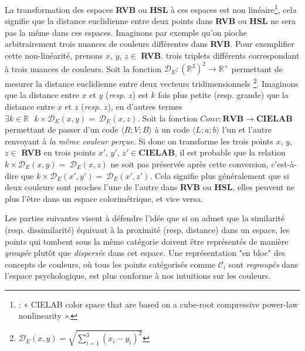 \documentclass{article}
\begin{document}
La transformation des espaces \textbf{RVB} ou \textbf{HSL} à ces espaces est non linéaire\footnote{\textcite[p.43]{fairchild2013}: « CIELAB color space that are based on a cube-root compressive power-law nonlinearity ».}, cela signifie que la distance euclidienne entre deux points dans \textbf{RVB} ou \textbf{HSL} ne sera pas la même dans ces espaces. Imaginons par exemple qu’on pioche arbitrairement trois nuances de couleurs différentes dans \textbf{RVB}. Pour exemplifier cette non-linéarité, prenons $x$, $y$, $z \in$ \textbf{RVB}. trois triplets différents correspondant à trois nuances de couleurs.  Soit la fonction \(\mathcal{D}_E\colon\left(\mathbb{R}^3\right)^2\rightarrow\mathbb{R}^+\) permettant de mesurer la distance euclidienne entre deux vecteurs tridimensionnels \footnote{$\mathcal{D}_E(x,y)=\sqrt{\sum_{i=1}^{3}\left(x_i - y_i \right)^2}$}. Imaginons que la distance entre $x$ et $y$ (\textit{resp.} $z$) est $k$ fois plus petite (resp. grande) que la distance entre $x$ et $z$ (\textit{resp.} $z$), en d’autres termes $\exists k\in\mathbb{R}\ \ \ k\times\mathcal{D}_E\left(x,y\right)=\ \mathcal{D}_E\left(x,z\right)$. Soit la fonction $Conv : \textbf{RVB} \rightarrow \textbf{CIELAB}$ permettant de passer d'un code $\langle R ; V ; B \rangle$ à un code $\langle L ;a ; b\rangle$ l’un et l’autre renvoyant à \textit{la même couleur perçue}. Si donc on transforme les trois points $x$, $y$, $z \in$ \textbf{RVB} en trois points $x'$, $y'$, $z' \in \textbf{CIELAB}$, il est probable que la relation $k\times\mathcal{D}_E\left(x,y\right)=\ \mathcal{D}_E\left(x,z\right)$ ne soit pas préservée après cette conversion, c’est-à-dire que $k\times\mathcal{D}_E\left(x',y'\right)=\ \mathcal{D}_E\left(x',z'\right)$. Cela signifie plus généralement que si deux couleurs sont proches l'une de l'autre dans \textbf{RVB} ou  \textbf{HSL}, elles peuvent ne plus l'être dans un espace colorimétrique, et vice versa.
\par
Les parties suivantes visent à défendre l’idée que si on admet que la similarité (resp. dissimilarité) équivaut à la proximité (resp. distance) dans un espace, les points qui tombent sous la même catégorie doivent être représentés de manière \textit{groupée} plutôt que \textit{dispersée} dans cet espace. Une représentation "en bloc" des concepts de couleurs, où tous les points catégorisés comme $\mathcal{C}_i$ sont \textit{regroupés} dans l'espace psychologique, est plus conforme à nos intuitions sur les couleurs.
\end{document}
